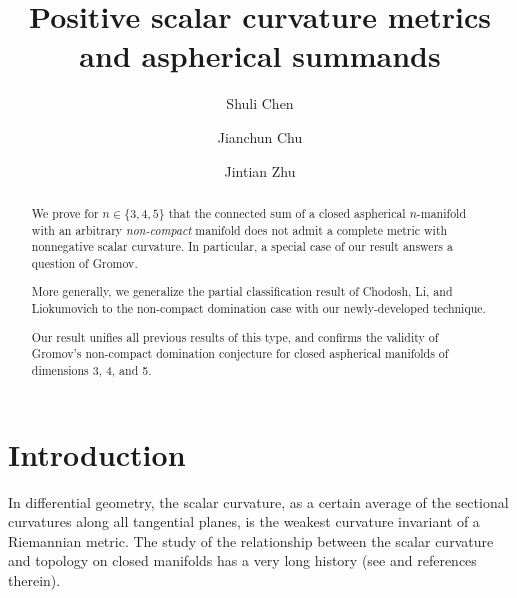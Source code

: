 \documentclass[11pt,letterpaper]{amsart}
\numberwithin{equation}{section}
\theoremstyle{definition}
\begin{document}
\title{Positive scalar curvature metrics and aspherical summands}


\author[S. Chen]{Shuli Chen}
\address[Shuli Chen]{Department of Mathematics, Stanford University, 450 Jane Stanford Way, Bldg 380, Stanford, CA 94305, United States 
\newline
\indent
{Current Address: Department of Mathematics, University of Chicago, 5734 S University Ave, Chicago IL, 60637, United States}}

\author[J. Chu]{Jianchun Chu}
\address[Jianchun Chu]{School of Mathematical Sciences, Peking University, Yiheyuan Road 5, Beijing 100871, People's Republic of China}

\author[J. Zhu]{Jintian Zhu}
\address[Jintian Zhu]{Institute for Theoretical Sciences, Westlake University, 600 Dunyu Road, Hangzhou, Zhejiang 310030, People's Republic of China}

\renewcommand{\subjclassname}{\textup{2020} Mathematics Subject Classification}

\begin{abstract}
We prove for $n\in\{3,4,5\}$ that the connected sum of a closed aspherical $n$-manifold with an arbitrary \emph{non-compact} manifold does not admit a complete metric with nonnegative scalar curvature. In particular, a special case of our result answers a question of Gromov.

More generally, we generalize the partial classification result of Chodosh, Li, and Liokumovich to the non-compact domination case with our newly-developed technique.

Our result unifies all previous results of this type, and confirms the validity of Gromov's non-compact domination conjecture for closed aspherical manifolds of dimensions 3, 4, and 5.

\end{abstract}

\maketitle

\section{Introduction}\label{Introduction}



In differential geometry, the scalar curvature, as
a certain average of the sectional curvatures along all tangential planes, is the weakest curvature invariant of a Riemannian metric.
The study of the relationship between the scalar curvature and topology on closed manifolds has a very long history (see \cite{Lic63, SY79a, GL80a, GL80b, SY87,Sch89,LM89,Gro96,Gro19,SY22} and references therein).
\end{document}
